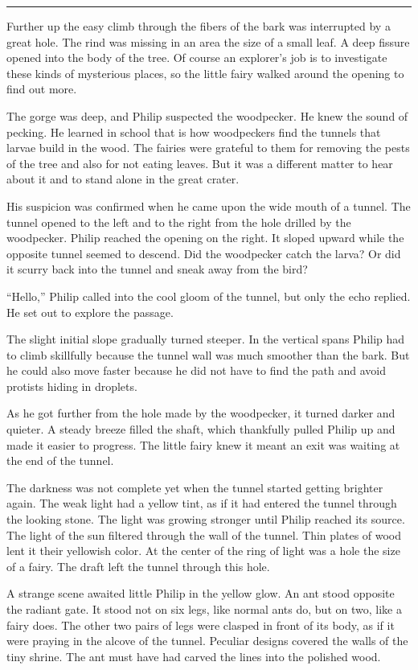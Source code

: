 \documentclass[10pt, draft]{memoir}
\renewcommand{\pfbreakdisplay}{\bigskip \ding{166} \bigskip}
\newcommand{\secbreak}{\fancybreak{\pfbreakdisplay}}
\begin{document}
\secbreak

Further up the easy climb through the fibers of the bark was interrupted by a great hole. The rind was missing in an area the size of a small leaf. A deep fissure opened into the body of the tree. Of course an explorer's job is to investigate these kinds of mysterious places, so the little fairy walked around the opening to find out more.

The gorge was deep, and Philip suspected the woodpecker. He knew the sound of pecking. He learned in school that is how woodpeckers find the tunnels that larvae build in the wood. The fairies were grateful to them for removing the pests of the tree and also for not eating leaves. But it was a different matter to hear about it and to stand alone in the great crater.

His suspicion was confirmed when he came upon the wide mouth of a tunnel. The tunnel opened to the left and to the right from the hole drilled by the woodpecker. Philip reached the opening on the right. It sloped upward while the opposite tunnel seemed to descend. Did the woodpecker catch the larva? Or did it scurry back into the tunnel and sneak away from the bird?

``Hello,'' Philip called into the cool gloom of the tunnel, but only the echo replied. He set out to explore the passage.

The slight initial slope gradually turned steeper. In the vertical spans Philip had to climb skillfully because the tunnel wall was much smoother than the bark. But he could also move faster because he did not have to find the path and avoid protists hiding in droplets.

As he got further from the hole made by the woodpecker, it turned darker and quieter. A steady breeze filled the shaft, which thankfully pulled Philip up and made it easier to progress. The little fairy knew it meant an exit was waiting at the end of the tunnel.

The darkness was not complete yet when the tunnel started getting brighter again. The weak light had a yellow tint, as if it had entered the tunnel through the looking stone. The light was growing stronger until Philip reached its source. The light of the sun filtered through the wall of the tunnel. Thin plates of wood lent it their yellowish color. At the center of the ring of light was a hole the size of a fairy. The draft left the tunnel through this hole.

A strange scene awaited little Philip in the yellow glow. An ant stood opposite the radiant gate. It stood not on six legs, like normal ants do, but on two, like a fairy does. The other two pairs of legs were clasped in front of its body, as if it were praying in the alcove of the tunnel. Peculiar designs covered the walls of the tiny shrine. The ant must have had carved the lines into the polished wood.
\end{document}
